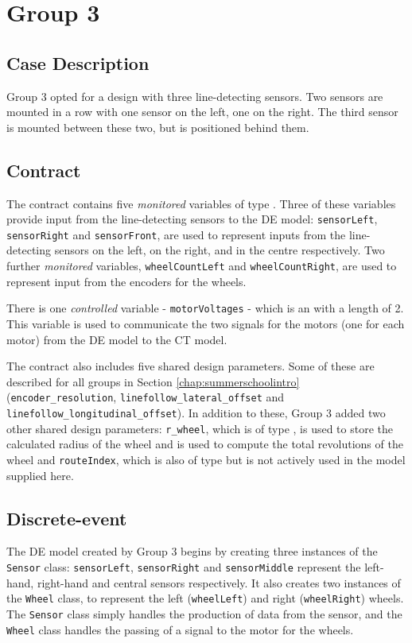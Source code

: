 \section{Group 3}
\subsection{Case Description}
Group 3 opted for a design with three line-detecting sensors.  Two
sensors are mounted in a row with one sensor on the left, one on the
right.  The third sensor is mounted between these two, but is
positioned behind them.

\subsection{Contract} 
The contract contains five \emph{monitored} variables of type
.  Three of these variables provide input from the
line-detecting sensors to the DE model: \texttt{sensorLeft},
\texttt{sensorRight} and \texttt{sensorFront}, are used to represent
inputs from the line-detecting sensors on the left, on the right, and
in the centre respectively.  Two further \emph{monitored} variables,
\texttt{wheelCountLeft} and \texttt{wheelCountRight}, are used to
represent input from the encoders for the wheels.

There is one \emph{controlled} variable - \texttt{motorVoltages} -
which is an  with a length of 2.  This variable is used to
communicate the two signals for the motors (one for each motor) from
the DE model to the CT model.

The contract also includes five shared design parameters.  Some of
these are described for all groups in Section
\ref{chap:summerschoolintro} (\texttt{encoder\_resolution},
\texttt{linefollow\_lateral\_offset} and
\texttt{linefollow\_longitudinal\_offset}).  In addition to these,
Group 3 added two other shared design parameters: \texttt{r\_wheel},
which is of type , is used to store the calculated radius
of the wheel and is used to compute the total revolutions of the wheel
and \texttt{routeIndex}, which is also of type  but is not
actively used in the model supplied here.

\subsection{Discrete-event} 
The DE model created by Group 3 begins by creating three instances of
the \texttt{Sensor} class: \texttt{sensorLeft}, \texttt{sensorRight}
and \texttt{sensorMiddle} represent the left-hand, right-hand and
central sensors respectively.  It also creates two instances of the
\texttt{Wheel} class, to represent the left (\texttt{wheelLeft}) and
right (\texttt{wheelRight}) wheels.  The \texttt{Sensor} class simply
handles the production of data from the sensor, and the \texttt{Wheel}
class handles the passing of a signal to the motor for the wheels.

